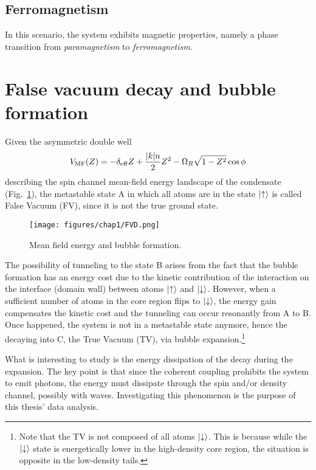 \subsection{Ferromagnetism}
In this scenario, the system exhibits magnetic properties, namely a phase transition from \textit{paramagnetism} to \textit{ferromagnetism}. 

\section{False vacuum decay and bubble formation}
Given the asymmetric double well
\begin{equation*}
    V_{\rm MF}(Z) = -\delta_{\rm eff} Z + \frac{|k|n}{2}Z^2 - \Omega_R \sqrt{1-Z^2}\cos\phi
\end{equation*}
describing the spin channel mean-field energy landscape of the condensate (Fig.\ \ref{fig:FVD}), the metastable state A in which all atoms are in the state $\ket{\uparrow}$ is called False Vacuum (FV), since it is not the true ground state.
\begin{figure}[h!]
    \centering
    \texttt{[image: figures/chap1/FVD.png]}
    \caption{Mean field energy and bubble formation.}
    \label{fig:FVD}
\end{figure}
The possibility of tunneling to the state B arises from the fact that the bubble formation has an energy cost due to the kinetic contribution of the interaction on the interface (domain wall) between atoms $\ket{\uparrow}$ and $\ket{\downarrow}$. However, when a sufficient number of atoms in the core region flips to $\ket{\downarrow}$, the energy gain compensates the kinetic cost and the tunneling can occur resonantly from A to B. Once happened, the system is not in a metastable state anymore, hence the decaying into C, the True Vacuum (TV), via bubble expansion.\footnote{Note that the TV is not composed of all atoms $\ket{\downarrow}$. This is because while the $\ket{\downarrow}$ state is energetically lower in the high-density core region, the situation is opposite in the low-density tails.}

What is interesting to study is the energy dissipation of the decay during the expansion. The key point is that since the coherent coupling prohibits the system to emit photons, the energy must dissipate through the spin and/or density channel, possibly with waves. Investigating this phenomenon is the purpose of this thesis' data analysis.

